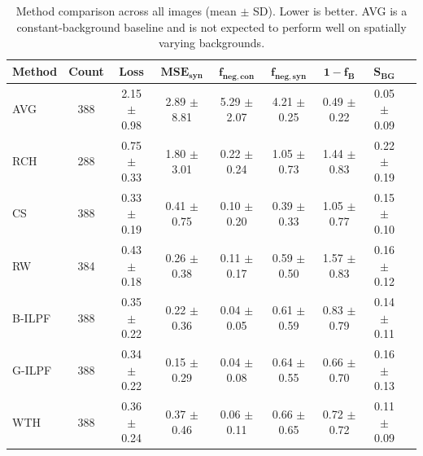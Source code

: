 \documentclass[iucr]{iucrjournals}
\begin{document}
\begin{table}[t]
\caption{Method comparison across all images (mean $\pm$ SD). Lower is better. AVG is a constant-background baseline and is not expected to perform well on spatially varying backgrounds.}

\label{tab:method_performance_new}
\centering
\small
\setlength{\tabcolsep}{3pt}
\renewcommand{\arraystretch}{1.1}
\begin{tabular}{@{}lcccccccc@{}}
\toprule
\textbf{Method} & \textbf{Count} & \textbf{Loss} &
$\mathbf{MSE}_{\mathbf{syn}}$ &
$\mathbf{f}_{\mathbf{neg,con}}$ &
$\mathbf{f}_{\mathbf{neg,syn}}$ &
$\mathbf{1-f_B}$ &
$\mathbf{S}_{\mathbf{BG}}$ \\ \midrule
AVG & 388 & 2.15 $\pm$ 0.98 & 2.89 $\pm$ 8.81 & 5.29 $\pm$ 2.07 & 4.21 $\pm$ 0.25 & 0.49 $\pm$ 0.22 & 0.05 $\pm$ 0.09 \\
RCH & 288 & 0.75 $\pm$ 0.33 & 1.80 $\pm$ 3.01 & 0.22 $\pm$ 0.24 & 1.05 $\pm$ 0.73 & 1.44 $\pm$ 0.83 & 0.22 $\pm$ 0.19 \\
CS & 388 & 0.33 $\pm$ 0.19 & 0.41 $\pm$ 0.75 & 0.10 $\pm$ 0.20 & 0.39 $\pm$ 0.33 & 1.05 $\pm$ 0.77 & 0.15 $\pm$ 0.10 \\
RW & 384 & 0.43 $\pm$ 0.18 & 0.26 $\pm$ 0.38 & 0.11 $\pm$ 0.17 & 0.59 $\pm$ 0.50 & 1.57 $\pm$ 0.83 & 0.16 $\pm$ 0.12 \\
B-ILPF & 388 & 0.35 $\pm$ 0.22 & 0.22 $\pm$ 0.36 & 0.04 $\pm$ 0.05 & 0.61 $\pm$ 0.59 & 0.83 $\pm$ 0.79 & 0.14 $\pm$ 0.11 \\
G-ILPF & 388 & 0.34 $\pm$ 0.22 & 0.15 $\pm$ 0.29 & 0.04 $\pm$ 0.08 & 0.64 $\pm$ 0.55 & 0.66 $\pm$ 0.70 & 0.16 $\pm$ 0.13 \\
WTH & 388 & 0.36 $\pm$ 0.24 & 0.37 $\pm$ 0.46 & 0.06 $\pm$ 0.11 & 0.66 $\pm$ 0.65 & 0.72 $\pm$ 0.72 & 0.11 $\pm$ 0.09 \\
\bottomrule
\end{tabular}
\end{table}
\end{document}
